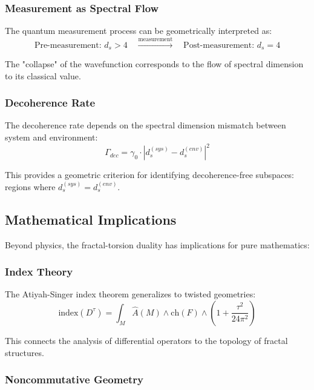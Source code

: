 \subsubsection{Measurement as Spectral Flow}

The quantum measurement process can be geometrically interpreted as:
\begin{equation}
    \text{Pre-measurement: } d_s > 4 \quad \xrightarrow{\text{measurement}} \quad \text{Post-measurement: } d_s = 4
\end{equation}

The "collapse" of the wavefunction corresponds to the flow of spectral dimension to its classical value.

\subsubsection{Decoherence Rate}

The decoherence rate depends on the spectral dimension mismatch between system and environment:
\begin{equation}
    \Gamma_{dec} = \gamma_0 \cdot |d_s^{(sys)} - d_s^{(env)}|^2
\end{equation}

This provides a geometric criterion for identifying decoherence-free subspaces: regions where $d_s^{(sys)} = d_s^{(env)}$.

\subsection{Mathematical Implications}

Beyond physics, the fractal-torsion duality has implications for pure mathematics:

\subsubsection{Index Theory}

The Atiyah-Singer index theorem generalizes to twisted geometries:
\begin{equation}
    \text{index}(D^\tau) = \int_M \hat{A}(M) \wedge \text{ch}(F) \wedge \left(1 + \frac{\tau^2}{24\pi^2}\right)
\end{equation}

This connects the analysis of differential operators to the topology of fractal structures.

\subsubsection{Noncommutative Geometry}

